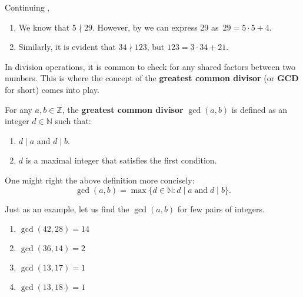 \documentclass[../lecture-notes-148x210.tex]{subfiles}
\begin{document}
\begin{example} \label{example:divisibility_2}
    Continuing , \hfill
    \begin{enumerate}
        \item We know that $5 \nmid 29$. However, by  we can express 29 
        as~$29 = 5 \cdot 5 + 4$.
        \item Similarly, it is evident that $34 \nmid 123$, but $123 = 3 \cdot 34 + 21$.
    \end{enumerate}
\end{example}

In division operations, it is common to check for any shared factors between two
numbers. This is where the concept of the \textbf{greatest common divisor} (or
\textbf{GCD} for short) comes into play.

\begin{definition}[GCD]
    For any $a, b \in \mathbb{Z}$, the \textbf{greatest common divisor} $\gcd(a, b)$ is defined as an integer $d \in \mathbb{N}$ such that:
    \begin{enumerate}
        \item $d \mid a$ and $d \mid b$.
        \item $d$ is a maximal integer that satisfies the first condition.
    \end{enumerate}

    One might right the above definition more concisely:
    \begin{equation*}
        \gcd(a,b) = \max\{d \in \mathbb{N}: d \mid a \; \text{and} \; d \mid b\}.
    \end{equation*}
\end{definition}

\begin{example}
    Just as an example, let us find the $\gcd(a, b)$ for few pairs of integers.
    
    \begin{multicols}{2}
        \begin{enumerate}
            \item $\gcd(42, 28) = 14$
            \item $\gcd(36, 14) = 2$
            \item $\gcd(13, 17) = 1$
            \item $\gcd(13, 18) = 1$
        \end{enumerate}
    \end{multicols}
\end{example}
\end{document}

